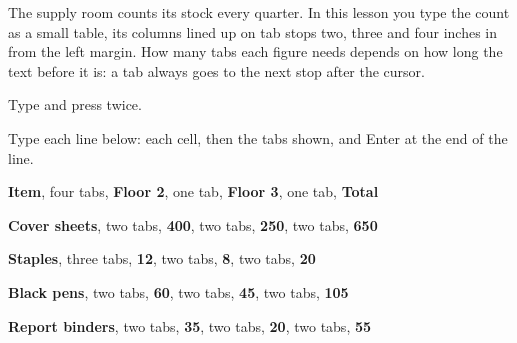 The supply room counts its stock every quarter.  In this lesson you type
the count as a small table, its columns lined up on tab stops two, three and
four inches in from the left margin.  How many tabs each figure needs
depends on how long the text before it is: a tab always goes to the next
stop after the cursor.

\begin{WPSteps}
\item Type  and press
 twice.
\item Type each line below: each cell, then the tabs shown, and Enter at the
end of the line.
\end{WPSteps}
\par\addvspace{4pt}
\begingroup\setlength\parskip{2pt}
%
\noindent\hspace*{4mm}\textbf{Item}, four tabs, \textbf{Floor 2}, one tab, \textbf{Floor 3}, one tab, \textbf{Total}\par
{}%
\noindent\hspace*{4mm}\textbf{Cover sheets}, two tabs, \textbf{400}, two tabs, \textbf{250}, two tabs, \textbf{650}\par
{}%
\noindent\hspace*{4mm}\textbf{Staples}, three tabs, \textbf{12}, two tabs, \textbf{8}, two tabs, \textbf{20}\par
{}%
\noindent\hspace*{4mm}\textbf{Black pens}, two tabs, \textbf{60}, two tabs, \textbf{45}, two tabs, \textbf{105}\par
{}%
\noindent\hspace*{4mm}\textbf{Report binders}, two tabs, \textbf{35}, two tabs, \textbf{20}, two tabs, \textbf{55}\par
\endgroup
\par\addvspace{4pt}

